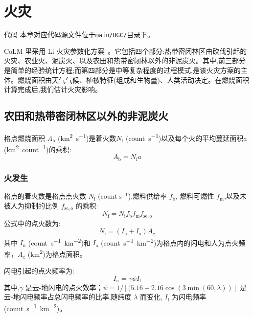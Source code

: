 \chapter{火灾}\label{ch:火灾}
\begin{mymdframed}{代码}
  本章对应代码源文件位于\texttt{main/BGC/}目录下。
\end{mymdframed}

CoLM 里采用 Li 火灾参数化方案~\citep{LiF2012,LiF2013,LiF2017,LiF2019}。它包括四个部分:热带密闭林区由砍伐引起的火灾、农业火、泥炭火、以及农田和热带密闭林以外的非泥炭火。其中,前三部分是简单的经验统计方程;而第四部分是中等复杂程度的过程模式,是该火灾方案的主体。燃烧面积由天气气候、植被特征(组成和生物量)、人类活动决定。在燃烧面积计算完成后,我们估计火灾影响。

\section{农田和热带密闭林区以外的非泥炭火}
格点燃烧面积 $A_{\mathrm {b}} $ (\unit{km^2.s^{-1}})是着火数$N_{\mathrm {f}} $ (\unit{count.s^{-1}})以及每个火的平均蔓延面积$a$ (\unit{km^2.count^{-1}})的乘积:
\begin{equation}
  A_{\mathrm {b}}  = N_{\mathrm {f}}  a
\end{equation}

\subsection{火发生}
格点的着火数是格点点火数 $N_{\mathrm {i}} $ ($\text{count}~\text{s}^{-1}$),燃料供给率 $f_{\mathrm {b}} $, 燃料可燃性 $f_{\mathrm {m}} $,以及未被人为抑制的比例 $f_{\mathrm{se,o}}$ 的乘积:
\begin{equation}
  N_{\mathrm {f}}  = N_{\mathrm {i}}  f_{\mathrm {b}}  f_{\mathrm {m}}  f_{\mathrm{se,o}}
\end{equation}
%
公式中的点火数为:
\begin{equation}
  N_{\mathrm{i}}=\left(I_{\mathrm{n}}+I_{\mathrm{a}}\right) A_{\mathrm{g}}
\end{equation}
%
其中 $I_{\mathrm {n}} $ (\unit{count.s^{-1}.km^{-2}})和 $I_{\mathrm {a}} $ (\unit{count.s^{-1}.km^{-2}})为格点内的闪电和人为点火频率，$A_{\mathrm {g}} $ (\unit{km^2})为格点面积。

闪电引起的点火频率为:
\begin{equation}
  I_{\mathrm{n}}=\gamma \psi I_{\mathrm{l}}
\end{equation}
其中,$\gamma$ 是云-地闪电的点火效率；$\psi=1/\left[(5.16+2.16\cos(3\min(60,\lambda))\right]$ 是云-地闪电频率占总闪电频率的比率,随纬度 $\lambda$ 而变化, $I_{\mathrm{l}}$ 为闪电频率 (\unit{count.s^{-1}.km^{-2}})。

